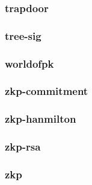 \begin{frame}\frametitle{trapdoor}
\begin{figure}
\begin{center}

\end{center}
\end{figure}
\end{frame}
\begin{frame}\frametitle{tree-sig}
\begin{figure}
\begin{center}

\end{center}
\end{figure}
\end{frame}
\begin{frame}\frametitle{worldofpk}
\begin{figure}
\begin{center}

\end{center}
\end{figure}
\end{frame}
\begin{frame}\frametitle{zkp-commitment}
\begin{figure}
\begin{center}

\end{center}
\end{figure}
\end{frame}
\begin{frame}\frametitle{zkp-hanmilton}
\begin{figure}
\begin{center}

\end{center}
\end{figure}
\end{frame}
\begin{frame}\frametitle{zkp-rsa}
\begin{figure}
\begin{center}

\end{center}
\end{figure}
\end{frame}
\begin{frame}\frametitle{zkp}
\begin{figure}
\begin{center}

\end{center}
\end{figure}
\end{frame}

